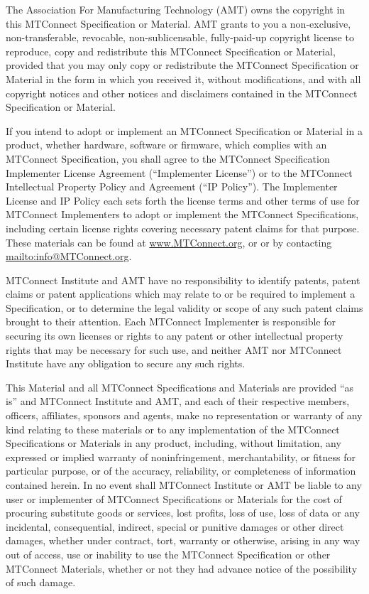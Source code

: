 The Association For Manufacturing Technology (AMT) owns the copyright in this MTConnect Specification or Material. AMT grants to you a non-exclusive, non-transferable, revocable, non-sublicensable, fully-paid-up copyright license to reproduce, copy and redistribute this MTConnect Specification or Material, provided that you may only copy or redistribute the MTConnect Specification or Material in the form in which you received it, without modifications, and with all copyright notices and other notices and disclaimers contained in the MTConnect Specification or Material.

If you intend to adopt or implement an MTConnect Specification or Material in a product, whether hardware, software or firmware, which complies with an MTConnect Specification, you shall agree to the MTConnect Specification Implementer License Agreement (``Implementer License'') or to the MTConnect Intellectual Property Policy and Agreement (``IP Policy''). The Implementer License and IP Policy each sets forth the license terms and other terms of use for MTConnect Implementers to adopt or implement the MTConnect Specifications, including certain license rights covering necessary patent claims for that purpose. These materials can be found at \url{www.MTConnect.org}, or or by contacting \url{mailto:info@MTConnect.org}. 

MTConnect Institute and AMT have no responsibility to identify patents, patent claims or patent applications which may relate to or be required to implement a Specification, or to determine the legal validity or scope of any such patent claims brought to their attention. Each MTConnect Implementer is responsible for securing its own licenses or rights to any patent or other intellectual property rights that may be necessary for such use, and neither AMT nor MTConnect Institute have any obligation to secure any such rights.

This Material and all MTConnect Specifications and Materials are provided ``as is'' and MTConnect Institute and AMT, and each of their respective members, officers, affiliates, sponsors and agents, make no representation or warranty of any kind relating to these materials or to any implementation of the MTConnect Specifications or Materials in any product, including, without limitation, any expressed or implied warranty of noninfringement, merchantability, or fitness for particular purpose, or of the accuracy, reliability, or completeness of information contained herein. In no event shall MTConnect Institute or AMT be liable to any user or implementer of MTConnect Specifications or Materials for the cost of procuring substitute goods or services, lost profits, loss of use, loss of data or any incidental, consequential, indirect, special or punitive damages or other direct damages, whether under contract, tort, warranty or otherwise, arising in any way out of access, use or inability to use the MTConnect Specification or other MTConnect Materials, whether or not they had advance notice of the possibility of such damage.
